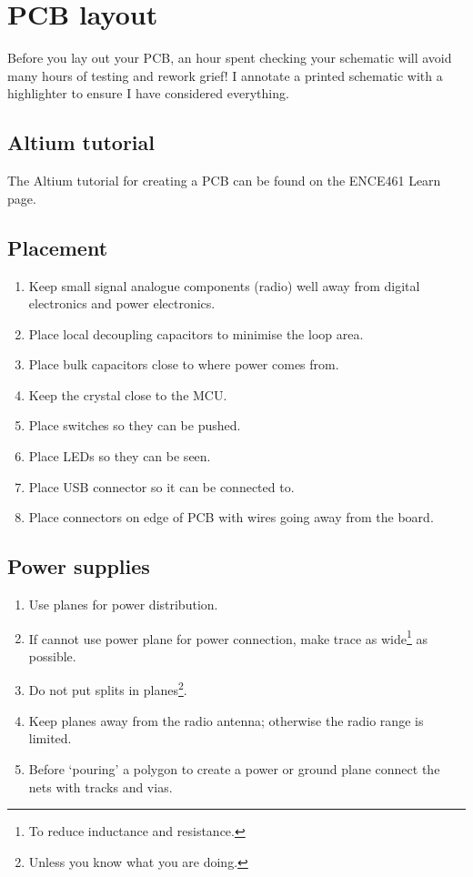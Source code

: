 \chapter{PCB layout}

Before you lay out your PCB, an hour spent checking your schematic
will avoid many hours of testing and rework grief!  I annotate a
printed schematic with a highlighter to ensure I have considered
everything.


\section{Altium tutorial}

The Altium tutorial for creating a PCB can be found on the ENCE461
Learn page.


\label{pcb-recommendations}

\section{Placement}
\label{placement}

\begin{enumerate}
\item
  Keep small signal analogue components (radio) well away from digital
  electronics and power electronics.
\item
  Place local decoupling capacitors to minimise the loop area.
\item
  Place bulk capacitors close to where power comes from.
\item
  Keep the crystal close to the MCU.
\item
  Place switches so they can be pushed.
\item
  Place LEDs so they can be seen.
\item
  Place USB connector so it can be connected to.
\item
  Place connectors on edge of PCB with wires going away from the board.
\end{enumerate}


\section{Power supplies}

\begin{enumerate}

\item Use planes for power distribution.

\item If cannot use power plane for power connection, make trace as
  wide\footnote{To reduce inductance and resistance.} as possible.

\item Do not put splits in planes\footnote{Unless you know what you
  are doing.}.

\item Keep planes away from the radio antenna; otherwise the radio
  range is limited.

\item Before `pouring' a polygon to create a power or ground plane
  connect the nets with tracks and vias.
\end{enumerate}


